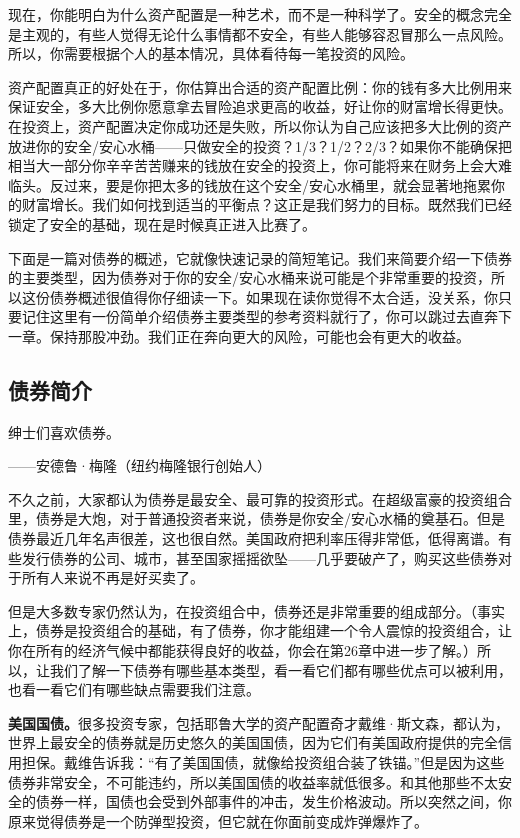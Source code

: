 现在，你能明白为什么资产配置是一种艺术，而不是一种科学了。安全的概念完全是主观的，有些人觉得无论什么事情都不安全，有些人能够容忍冒那么一点风险。所以，你需要根据个人的基本情况，具体看待每一笔投资的风险。

资产配置真正的好处在于，你估算出合适的资产配置比例：你的钱有多大比例用来保证安全，多大比例你愿意拿去冒险追求更高的收益，好让你的财富增长得更快。在投资上，资产配置决定你成功还是失败，所以你认为自己应该把多大比例的资产放进你的安全/安心水桶——只做安全的投资？1/3？1/2？2/3？如果你不能确保把相当大一部分你辛辛苦苦赚来的钱放在安全的投资上，你可能将来在财务上会大难临头。反过来，要是你把太多的钱放在这个安全/安心水桶里，就会显著地拖累你的财富增长。我们如何找到适当的平衡点？这正是我们努力的目标。既然我们已经锁定了安全的基础，现在是时候真正进入比赛了。

下面是一篇对债券的概述，它就像快速记录的简短笔记。我们来简要介绍一下债券的主要类型，因为债券对于你的安全/安心水桶来说可能是个非常重要的投资，所以这份债券概述很值得你仔细读一下。如果现在读你觉得不太合适，没关系，你只要记住这里有一份简单介绍债券主要类型的参考资料就行了，你可以跳过去直奔下一章。保持那股冲劲。我们正在奔向更大的风险，可能也会有更大的收益。

\subsection{债券简介}

\begin{BookQuote}
绅士们喜欢债券。

\hfill ——安德鲁·梅隆（纽约梅隆银行创始人）
\end{BookQuote}

不久之前，大家都认为债券是最安全、最可靠的投资形式。在超级富豪的投资组合里，债券是大炮，对于普通投资者来说，债券是你安全/安心水桶的奠基石。但是债券最近几年名声很差，这也很自然。美国政府把利率压得非常低，低得离谱。有些发行债券的公司、城市，甚至国家摇摇欲坠——几乎要破产了，购买这些债券对于所有人来说不再是好买卖了。

但是大多数专家仍然认为，在投资组合中，债券还是非常重要的组成部分。（事实上，债券是投资组合的基础，有了债券，你才能组建一个令人震惊的投资组合，让你在所有的经济气候中都能获得良好的收益，你会在第26章中进一步了解。）所以，让我们了解一下债券有哪些基本类型，看一看它们都有哪些优点可以被利用，也看一看它们有哪些缺点需要我们注意。

\textbf{美国国债。}很多投资专家，包括耶鲁大学的资产配置奇才戴维·斯文森，都认为，世界上最安全的债券就是历史悠久的美国国债，因为它们有美国政府提供的完全信用担保。戴维告诉我：“有了美国国债，就像给投资组合装了铁锚。”但是因为这些债券非常安全，不可能违约，所以美国国债的收益率就低很多。和其他那些不太安全的债券一样，国债也会受到外部事件的冲击，发生价格波动。所以突然之间，你原来觉得债券是一个防弹型投资，但它就在你面前变成炸弹爆炸了。

